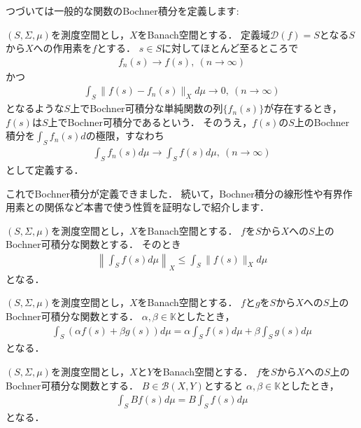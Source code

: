 つづいては一般的な関数のBochner積分を定義します:

\begin{defi}[Bochner積分]\label{def:bochner_integral}
$(S, \Sigma, \mu)$を測度空間とし，$X$をBanach空間とする．
定義域${\mathcal D}(f) = S$となる$S$から$X$への作用素を$f$とする．
$s \in S$に対してほとんど至るところで
\begin{align*}
f_n(s) \rightarrow f(s), ~  (n \rightarrow \infty) 
\end{align*}
かつ
\begin{align*}
\int_S \| f(s) - f_n(s) \|_{X} d \mu \rightarrow 0, ~ ( n \rightarrow \infty)
\end{align*}
となるような$S$上でBochner可積分な単純関数の列$\{ f_n(s) \}$が存在するとき，$f(s)$は$S$上でBochner可積分であるという．
そのうえ，$f(s)$の$S$上のBochner積分を$\int_S f_n(s) d$の極限，すなわち
\begin{align*}
\int_S f_n(s) d \mu \rightarrow \int_S f(s) d \mu , ~ ( n \rightarrow \infty)
\end{align*}
として定義する．
\end{defi}

これでBochner積分が定義できました．
続いて，Bochner積分の線形性や有界作用素との関係など本書で使う性質を証明なしで紹介します．

\begin{Thm}[Bochner積分のノルム評価]
	$(S, \Sigma, \mu)$を測度空間とし，$X$をBanach空間とする．
	$f$を$S$から$X$への$S$上のBochner可積分な関数とする．
	そのとき
	\begin{align*}
		\left\| \int_S f(s) d \mu \right\|_{X} \le \int_S \| f(s) \|_{X} d \mu
	\end{align*}
	となる．
\end{Thm}

\begin{Thm}[Bochner積分の線形性]
	$(S, \Sigma, \mu)$を測度空間とし，$X$をBanach空間とする．
	$f$と$g$を$S$から$X$への$S$上のBochner可積分な関数とする．
	$\alpha, \beta \in {\mathbb K}$としたとき，
	\begin{align*}
		\int_S \left( \alpha f(s) + \beta g(s) \right) d \mu = \alpha \int_S f(s) d \mu + \beta \int_S g(s) d \mu
	\end{align*}
	となる．
\end{Thm}

\begin{Thm}[有界線形作用素とBochner積分の関係]
	$(S, \Sigma, \mu)$を測度空間とし，$X$と$Y$をBanach空間とする．
	$f$を$S$から$X$への$S$上のBochner可積分な関数とする．
	$B \in {\mathcal B}(X, Y)$とすると
	$\alpha, \beta \in {\mathbb K}$としたとき，
	\begin{align*}
		\int_S B f(s) d \mu = B \int_S f(s) d \mu
	\end{align*}
	となる．
\end{Thm}

